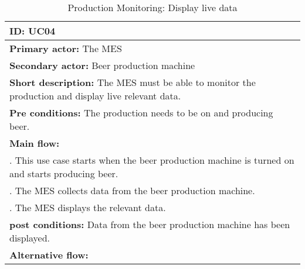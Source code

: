 \begin{table}[ht]
    \begin{tabularx}{\textwidth}{|>{\RaggedRight}X|}
        \hline
        \textbf{ID:} UC04  \\
        \hline
        \textbf{Primary actor:} The MES \\
        \hline
        \textbf{Secondary actor:} Beer production machine \\
        \hline
        \textbf{Short description:} The MES must be able to monitor the
        production and display live relevant data. \\
        \hline
        \textbf{Pre conditions:} The production needs to be on and producing
        beer. \\
        \hline
        \textbf{Main flow:} \\
        	1. This use case starts when the beer production machine is turned
        	on and starts producing beer. \\
			2. The MES collects data from the beer production machine. \\
			3. The MES displays the relevant data. \\
		\hline
        \textbf{post conditions:} Data from the beer production machine has been
        displayed. \\
        \hline
        \textbf{Alternative flow:} \\
        \hline
    \end{tabularx}
    \caption{Production Monitoring: Display live data}
    \label{table:usecase_displayLiveRelevantData}
\end{table}

